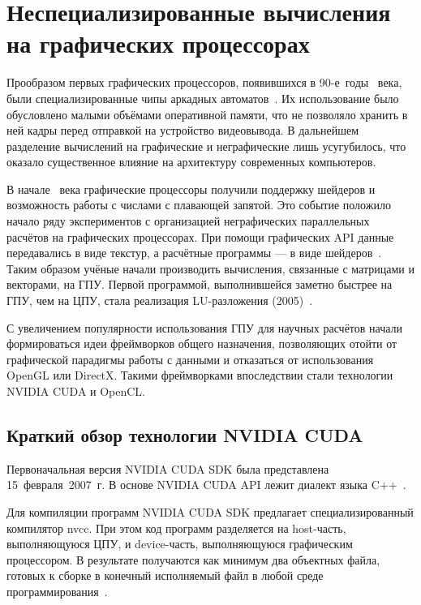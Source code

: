 \section{Неспециализированные вычисления на графических процессорах}

Прообразом первых графических процессоров, появившихся в 90-е~годы
~века, были специализированные чипы аркадных автоматов~\cite{enwiki:gpu}. Их использование было обусловлено малыми объёмами оперативной памяти, что не позволяло хранить в ней кадры перед отправкой на устройство видеовывода. В
дальнейшем разделение вычислений на графические и неграфические лишь
усугубилось, что оказало существенное влияние на архитектуру современных
компьютеров.

В начале ~века графические процессоры получили поддержку шейдеров и возможность работы с числами с плавающей запятой. Это событие положило начало ряду экспериментов с организацией неграфических параллельных
расчётов на графических процессорах. При помощи графических API данные
передавались в виде текстур, а расчётные программы --- в виде шейдеров~\cite{Berillo}.
Таким образом учёные начали производить вычисления, связанные с матрицами и векторами, на ГПУ. Первой программой, выполнившейся заметно быстрее
на ГПУ, чем на ЦПУ, стала реализация LU-разложения (2005)~\cite{LU-GPU}.

С увеличением популярности использования ГПУ для научных расчётов
начали формироваться идеи фреймворков общего назначения, позволяющих
отойти от графической парадигмы работы с данными и отказаться от использования OpenGL или DirectX. Такими фреймворками впоследствии стали технологии NVIDIA CUDA и OpenCL.

\subsection{Краткий обзор технологии NVIDIA CUDA}

Первоначальная версия NVIDIA CUDA SDK была представлена 15~февраля~2007~г.
В основе NVIDIA CUDA API лежит диалект языка C++~\cite{enwiki:CUDA}.

Для компиляции программ NVIDIA CUDA SDK предлагает специализированный компилятор nvcc. При этом код программ разделяется на host-часть, выполняющуюся ЦПУ, и device-часть, выполняющуюся графическим процессором. В результате получаются как минимум два объектных файла, готовых к сборке в
конечный исполняемый файл в любой среде программирования~\cite{CUDAToolkitDocumentation}.

